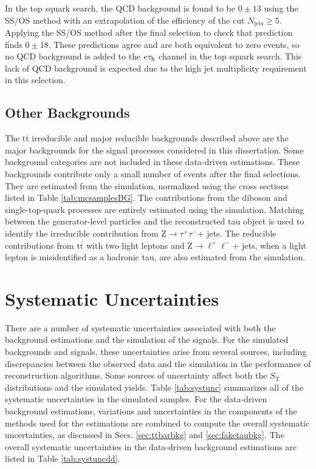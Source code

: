 \documentclass[12pt]{thesis}  %
\newcommand{\tauh}{\ensuremath{\tau_{\text{h}}}\xspace}
\newcommand{\Pe}{\ensuremath{\cmsSymbolFace{e}}\xspace}
\newcommand{\etau}{\ensuremath{\Pe\tauh}\xspace}
\renewcommand{\ttbar}{\ensuremath{\mathrm{t}\overline{\mathrm{t}}}\xspace}
\newcommand{\PZ}{\ensuremath{{\mathrm{Z}}}\xspace}%
\newcommand{\ra}{\ensuremath{\rightarrow}}%
\newcommand{\TpTm}{\ensuremath{\tau^+\tau^-}}%
\newcommand{\LpLm}{\ensuremath{\ell^+\ell^-}}%
\newcommand{\Ztt}{\ensuremath{\PZ \ra \TpTm}\xspace}%
\newcommand{\Zll}{\ensuremath{\PZ \ra \LpLm}\xspace}%
\def\ST{\ensuremath{S_{\text{T}}}\xspace}
\begin{document}
In the top squark search, the QCD background is found to be $0 \pm 13$ using the SS/OS method with an extrapolation of the efficiency of the cut $N_{\text{jets}}\geq5$. Applying the SS/OS method after the final selection to check that prediction finds $0 \pm 18$. These predictions agree and are both equivalent to zero events, so no QCD background is added to the \etau channel in the top squark search. This lack of QCD background is expected due to the high jet multiplicity requirement in this selection.


\subsection{Other Backgrounds}

The \ttbar irreducible and major reducible backgrounds described above are the major backgrounds for the signal processes considered in this dissertation. Some background categories are not included in these data-driven estimations. These backgrounds contribute only a small number of events after the final selections. They are estimated from the simulation, normalized using the cross sections listed in Table \ref{tab:mcsamplesBG}. The contributions from the diboson and single-top-quark processes are entirely estimated using the simulation. Matching between the generator-level particles and the reconstructed tau object is used to identify the irreducible contribution from \Ztt + jets. The reducible contributions from \ttbar with two light leptons and \Zll + jets, when a light lepton is misidentified as a hadronic tau, are also estimated from the simulation.

\section{Systematic Uncertainties
\label{sec:systematics}}

There are a number of systematic uncertainties associated with both the background estimations and the simulation of the signals. For the simulated backgrounds and signals, these uncertainties arise from several sources, including discrepancies between the observed data and the simulation in the performance of reconstruction algorithms. Some sources of uncertainty affect both the \ST distributions and the simulated yields. Table \ref{tab:systunc} summarizes all of the systematic uncertainties in the simulated samples. For the data-driven background estimations, variations and uncertainties in the components of the methods used for the estimations are combined to compute the overall systematic uncertainties, as discussed in Secs. \ref{sec:ttbarbkg} and \ref{sec:faketaubkg}. The overall systematic uncertainties in the data-driven background estimations are listed in Table \ref{tab:systuncdd}.
\end{document}
